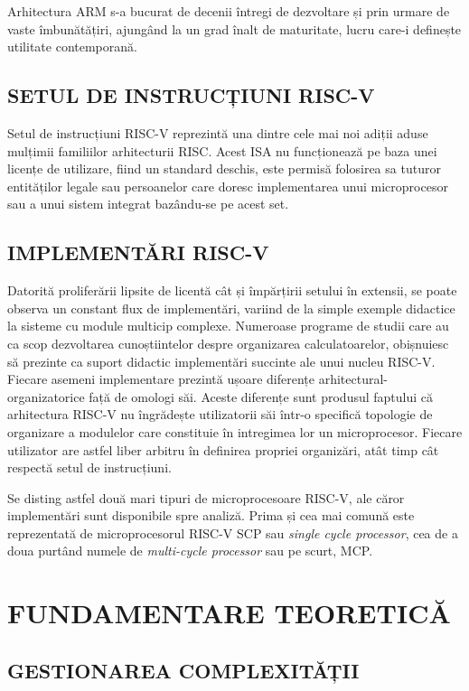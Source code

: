 \documentclass[12pt]{article}
\begin{document}
Arhitectura ARM s-a bucurat de decenii întregi de dezvoltare și prin urmare de vaste îmbunătățiri, ajungând la un grad înalt de maturitate, lucru care-i definește utilitate contemporană.

\subsection{SETUL DE INSTRUCȚIUNI RISC-V}
Setul de instrucțiuni RISC-V reprezintă una dintre cele mai noi adiții aduse mulțimii familiilor arhitecturii RISC. Acest ISA nu funcționează pe baza unei licențe de utilizare, fiind un standard deschis, este permisă folosirea sa tuturor entităților legale sau persoanelor care doresc implementarea unui microprocesor sau a unui sistem integrat bazându-se pe acest set.

\subsection{IMPLEMENTĂRI  RISC-V}
Datorită proliferării lipsite de licentă cât și împărțirii setului în extensii, se poate observa un constant flux de implementări, variind de la simple exemple didactice la sisteme cu module multicip complexe. Numeroase programe de studii care au ca scop dezvoltarea cunoștiintelor despre organizarea calculatoarelor, obișnuiesc să prezinte ca suport didactic implementări succinte ale unui nucleu RISC-V. Fiecare asemeni implementare prezintă ușoare diferențe arhitectural-organizatorice față de omologi săi. Aceste diferențe sunt produsul faptului că arhitectura RISC-V nu îngrădește utilizatorii săi într-o specifică topologie de organizare a modulelor care constituie în intregimea lor un microprocesor. Fiecare utilizator are astfel liber arbitru în definirea propriei organizări, atât timp cât respectă setul de instrucțiuni.

Se disting astfel două mari tipuri de microprocesoare RISC-V, ale căror implementări sunt disponibile spre analiză. Prima și cea mai comună este reprezentată de microprocesorul RISC-V SCP sau \textit{single cycle processor}, cea de a doua purtând numele de \textit{multi-cycle processor} sau pe scurt, MCP.

\newpage
\section{\centering FUNDAMENTARE TEORETICĂ}
\bigbreak
\subsection{GESTIONAREA COMPLEXITĂȚII}
\end{document}
